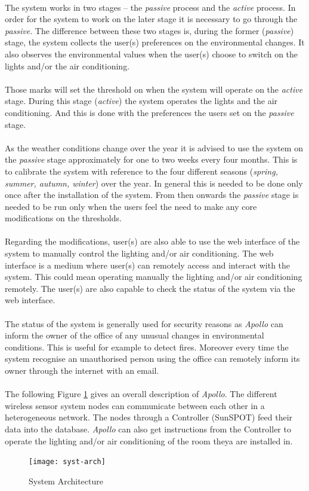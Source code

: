 \documentclass[12pt,a4paper,draft]{report}
\begin{document}
\ \\
The system works in two stages -- the \emph{passive} process and the \emph{active} process. In order for the system to work on the later stage it is necessary to go through the \emph{passive}. The difference between these two stages is, during the former (\emph{passive}) stage, the system collects the user(s) preferences on the environmental changes. It also observes the environmental values when the user(s) choose to switch on the lights and/or the air conditioning.\\
\ \\
Those marks will set the threshold on when the system will operate on the \emph{active} stage. During this stage (\textit{active}) the system operates the lights and the air conditioning. And this is done with the preferences the users set on the \emph{passive} stage.\\
\ \\
As the weather conditions change over the year it is advised to use the system on the \emph{passive} stage approximately for one to two weeks every four months. This is to calibrate the system with reference to the four different seasons (\textit{spring, summer, autumn, winter}) over the year. In general this is needed to be done only once after the installation of the system. From then onwards the \emph{passive} stage is needed to be run only when the users feel the need to make any core modifications on the thresholds.\\
\ \\
Regarding the modifications, user(s) are also able to use the web interface of the system to manually control the lighting and/or air conditioning. The web interface is a medium where user(s) can remotely access and interact with the system. This could mean operating manually the lighting and/or air conditioning remotely. The user(s) are also capable to check the status of the system via the web interface.\\
\ \\
The status of the system is generally used for security reasons as \emph{Apollo} can inform the owner of the office of any unusual changes in environmental conditions. This is useful for example to detect fires. Moreover every time the system recognise an unauthorised person using the office can remotely inform its owner through the internet with an email.\\
\ \\
The following Figure \ref{syst-arch} gives an overall description of \emph{Apollo}. The different wireless sensor system nodes can communicate between each other in a heterogeneous network. The nodes through a Controller (SunSPOT) feed their data into the database. \emph{Apollo} can also get instructions from the Controller to operate the lighting and/or air conditioning of the room theya are installed in.
\ \\
\begin{figure}[H]
\centering
\texttt{[image: syst-arch]}
\caption{System Architecture}
\label{syst-arch}
\end{figure}
\ \\
%
\newpage
%
\end{document}
